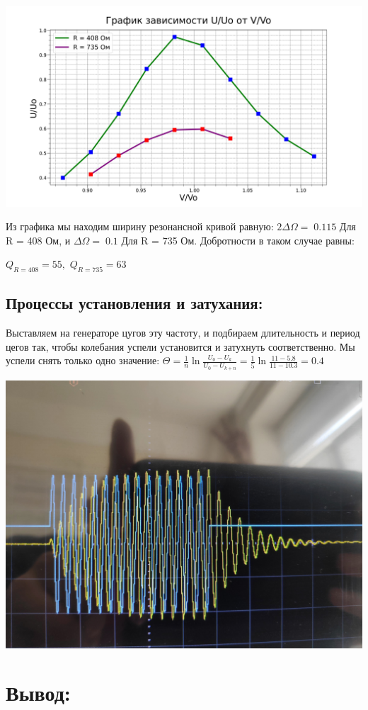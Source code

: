 \documentclass[a4paper,12pt]{article}
\begin{document}
\begin{enumerate}
 \includegraphics[width=1\linewidth]{graphikmoy.jpg}


Из графика мы находим ширину резонансной кривой равную: $2{\Delta\Omega } =\;0.115 $ Для R = 408 Ом, и ${\Delta\Omega } =\;0.1 $ Для R = 735 Ом.
Добротности в таком случае равны:

$ Q_{R=408} = 55,$
$ Q_{R=735} = 63 $
\newpage
\subsection{Процессы установления и затухания:}
Выставляем на генераторе цугов
эту частоту, и подбираем длительность и период цегов так, чтобы колебания успели
установится и затухнуть соответственно.
Мы успели снять только одно значение: 
$ {\Theta = \frac{1}{n} \ln \frac{U_0 - U_k}{U_0 - U_{k+n}} = \frac{1}{5} \ln \frac{11 - 5.8}{11 - 10.3}} = 0.4	$

 \includegraphics[width=0.7\linewidth]{Abama.jpg}

\section{Вывод:}


\end{enumerate}
\end{document}

